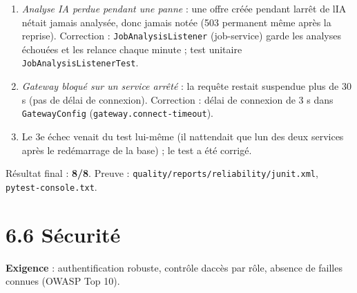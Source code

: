 \documentclass[
  11pt,
]{article}
\providecommand{\tightlist}{%
  \setlength{\itemsep}{0pt}\setlength{\parskip}{0pt}}
\begin{document}
\begin{enumerate}
\def\labelenumi{\arabic{enumi}.}
\tightlist
\item
  \emph{Analyse IA perdue pendant une panne} : une offre créée pendant
  l\textquotesingle arrêt de l\textquotesingle IA
  n\textquotesingle était jamais analysée, donc jamais notée (503
  permanent même après la reprise). Correction :
  \texttt{JobAnalysisListener} (job-service) garde les analyses échouées
  et les relance chaque minute ; test unitaire
  \texttt{Job}\allowbreak{}\texttt{Analysis}\allowbreak{}\texttt{Listener}\allowbreak{}\texttt{Test}.
\item
  \emph{Gateway bloqué sur un service arrêté} : la requête restait
  suspendue plus de 30 s (pas de délai de connexion). Correction : délai
  de connexion de 3 s dans \texttt{GatewayConfig}
  (\texttt{gateway.}\allowbreak{}\texttt{connect-}\allowbreak{}\texttt{timeout}).
\item
  Le 3e échec venait du test lui-même (il n\textquotesingle attendait
  que l\textquotesingle un des deux services après le redémarrage de la
  base) ; le test a été corrigé.
\end{enumerate}

Résultat final : \textbf{8/8}. Preuve :
\texttt{quality/}\allowbreak{}\texttt{reports/}\allowbreak{}\texttt{reliability/}\allowbreak{}\texttt{junit.}\allowbreak{}\texttt{xml},
\texttt{pytest-console.txt}.

\section{6.6 Sécurité}\label{66-suxe9curituxe9}

\textbf{Exigence} : authentification robuste, contrôle
d\textquotesingle accès par rôle, absence de failles connues (OWASP Top
10).
\end{document}
